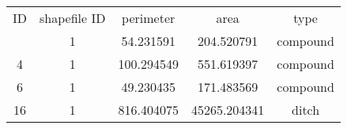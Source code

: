 \begin{tabular}{ccccc}
    \toprule
    ID & shapefile ID & perimeter & area & type\\
    \otoprule
    1 & 1 & 54.231591 & 204.520791 & compound\\
    4 & 1 & 100.294549 & 551.619397 & compound\\
    6 & 1 & 49.230435 & 171.483569 & compound\\
    16 & 1 & 816.404075 & 45265.204341 & ditch\\
    \bottomrule
\end{tabular}
